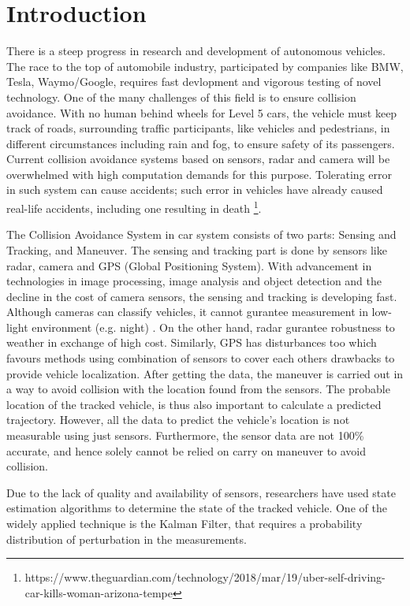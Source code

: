 \chapter{Introduction} \label{ch:intro}
There is a steep progress in research and development of autonomous vehicles. The race to the top of automobile industry, participated by companies like BMW, Tesla, Waymo/Google, requires fast devlopment and vigorous testing of novel technology. One of the many challenges of this field is to ensure collision avoidance. With no human behind wheels for Level 5 \cite{SAE2014} cars, the vehicle must keep track of roads, surrounding traffic participants, like vehicles and pedestrians, in different circumstances including rain and fog, to ensure safety of its passengers. Current collision avoidance systems based on sensors, radar and camera will be overwhelmed with high computation demands for this purpose. Tolerating error in such system can cause accidents; such error in vehicles have already caused real-life accidents, including one resulting in death \footnote{https://www.theguardian.com/technology/2018/mar/19/uber-self-driving-car-kills-woman-arizona-tempe}.


The Collision Avoidance System in car system consists of two parts: Sensing and Tracking, and Maneuver. The sensing and tracking part is done by sensors like radar, camera and GPS (Global Positioning System). With advancement in technologies in image processing, image analysis and object detection and the decline in the cost of camera sensors, the sensing and tracking is developing fast. Although cameras can classify vehicles, it cannot gurantee measurement in low-light environment (e.g. night) \cite{Hirz2018}. On the other hand, radar gurantee robustness to weather in exchange of high cost. Similarly, GPS has disturbances too which favours methods using combination of sensors to cover each others drawbacks to provide vehicle localization. After getting the data, the maneuver is carried out in a way to avoid collision with the location found from the sensors. The probable location of the tracked vehicle, is thus also important to calculate a predicted trajectory. However, all the data to predict the vehicle's location is not measurable using just sensors. Furthermore, the sensor data are not 100\% accurate, and hence solely cannot be relied on carry on maneuver to avoid collision.

Due to the lack of quality and availability of sensors, researchers have used state estimation algorithms to determine the state of the tracked vehicle. One of the widely applied technique is the Kalman Filter, that requires a probability distribution of perturbation in the measurements.  

